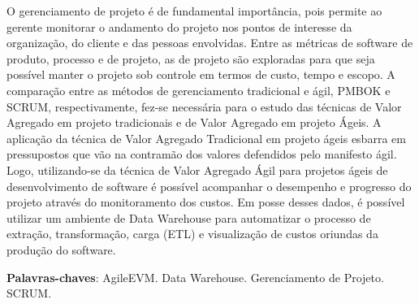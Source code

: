 \begin{resumo}
O gerenciamento de projeto é de fundamental importância, pois permite ao gerente monitorar o andamento do projeto nos pontos de interesse da organização, do cliente e das pessoas envolvidas. Entre as métricas de software de produto, processo e de projeto, as de projeto são exploradas para que seja possível manter o projeto sob controle em termos de custo, tempo e escopo. A comparação entre as métodos de gerenciamento tradicional e ágil, PMBOK e SCRUM, respectivamente, fez-se necessária para o estudo das técnicas de Valor Agregado em projeto tradicionais e de Valor Agregado em projeto Ágeis. A aplicação da técnica de Valor Agregado Tradicional em projeto ágeis esbarra em pressupostos que vão na contramão dos valores defendidos pelo manifesto ágil. Logo, utilizando-se da técnica de Valor Agregado Ágil para projetos ágeis de desenvolvimento de software é possível acompanhar o desempenho e progresso do projeto através do monitoramento dos custos. Em posse desses dados, é possível utilizar um ambiente de Data Warehouse para automatizar o processo de extração, transformação, carga (ETL) e visualização de custos oriundas da produção do software.

 \vspace{\onelineskip}
    
 \noindent
 \textbf{Palavras-chaves}: AgileEVM. Data Warehouse. Gerenciamento de Projeto. SCRUM.
\end{resumo}
